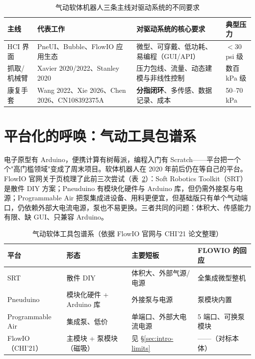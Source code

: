\begin{table}[htbp]
  \centering
  \caption{气动软体机器人三条主线对驱动系统的不同要求}
  \label{tab:intro-lines}
  \begin{tabular}{lp{4.2cm}p{4.6cm}l}
    \toprule
    主线 & 代表工作 & 对驱动系统的核心要求 & 典型压力 \\
    \midrule
    HCI 界面 & PneUI、Bubble、FlowIO 应用生态 & 微型、可穿戴、低功耗、易编程（GUI/API） & $<$30\,psi 级 \\
    抓取/机械臂 & Xavier 2020/2022、Stanley 2020 & 压力包线、流量、动态建模与非线性控制 & 数百 kPa 级 \\
    康复手套 & Wang 2022、Xie 2026、Chen 2026、CN108392375A & \textbf{分指闭环}、多传感、数据记录、成本 & 50--70\,kPa \\
    \bottomrule
  \end{tabular}
\end{table}

\section{平台化的呼唤：气动工具包谱系}
\label{sec:intro-toolkits}

电子原型有 Arduino，便携计算有树莓派，编程入门有 Scratch——平台把一个个"高门槛领域"变成了周末项目。软体机器人在 2020 年前后仍在等自己的平台。FlowIO 官网关于页梳理了此前三次尝试（表~\ref{tab:intro-toolkits}）：Soft Robotics Toolkit（SRT）是散件 DIY 方案；Pneuduino 有模块化硬件与 Arduino 库，但仍需外接泵与电源；Programmable Air 把泵集成进设备、用料更便宜，但基础版只有单个气动端口，仍依赖外部大电流电源，泵也不易更换。三者共同的问题：体积大、传感能力有限、缺 GUI、只兼容 Arduino。

\begin{table}[htbp]
  \centering
  \caption{气动软体工具包谱系（依据 FlowIO 官网与 CHI'21 论文整理）}
  \label{tab:intro-toolkits}
  \begin{tabular}{llp{3.2cm}p{4.4cm}}
    \toprule
    平台 & 形态 & 主要短板 & FLOWIO 的回应 \\
    \midrule
    SRT & 散件 DIY & 体积大、外部气源/电源 & 全集成微型整机 \\
    Pneuduino & 模块化硬件 + Arduino 库 & 外接泵与电源 & 泵模块内置 \\
    Programmable Air & 集成泵、低价 & 单端口、外部大电流电源 & 5 端口、可换泵模块 \\
    FlowIO（CHI'21） & 主模块 + 泵模块（磁吸） & 见 \S\ref{sec:intro-limits} & ——（对标本体） \\
    \bottomrule
  \end{tabular}
\end{table}

